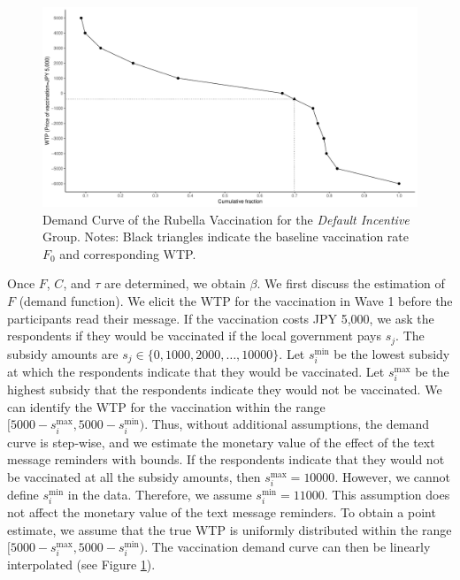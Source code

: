 \documentclass[
]{article}
\begin{document}
\begin{figure}[t]
\includegraphics{Supplementary-Material_files/figure-latex/demand-function-1} \caption{Demand Curve of the Rubella Vaccination for the \emph{Default Incentive} Group. Notes: Black triangles indicate the baseline vaccination rate $F_0$ and corresponding WTP.}\label{fig:demand-function}
\end{figure}

Once \(F\), \(C\), and \(\tau\) are determined, we obtain \(\beta\). We first discuss the estimation of \(F\) (demand function). We elicit the WTP for the vaccination in Wave 1 before the participants read their message. If the vaccination costs JPY 5,000, we ask the respondents if they would be vaccinated if the local government pays \(s_j\). The subsidy amounts are \(s_j \in \{0, 1000, 2000, \ldots , 10000\}\). Let \(s_i^{\text{min}}\) be the lowest subsidy at which the respondents indicate that they would be vaccinated. Let \(s_i^{\text{max}}\) be the highest subsidy that the respondents indicate they would not be vaccinated. We can identify the WTP for the vaccination within the range \([5000 - s_i^{\text{max}}, 5000 - s_i^{\text{min}})\). Thus, without additional assumptions, the demand curve is step-wise, and we estimate the monetary value of the effect of the text message reminders with bounds. If the respondents indicate that they would not be vaccinated at all the subsidy amounts, then \(s_i^{\text{max}} = 10000\). However, we cannot define \(s_i^{\text{min}}\) in the data. Therefore, we assume \(s_i^{\text{min}} = 11000\). This assumption does not affect the monetary value of the text message reminders. To obtain a point estimate, we assume that the true WTP is uniformly distributed within the range \([5000 - s_i^{\text{max}}, 5000 - s_i^{\text{min}})\). The vaccination demand curve can then be linearly interpolated (see Figure \ref{fig:demand-function}).
\end{document}
